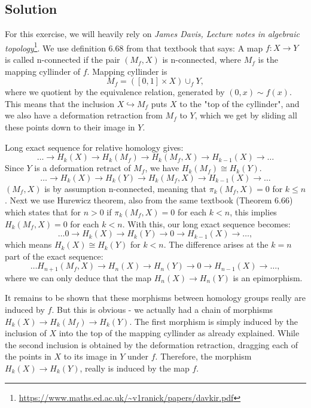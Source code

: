 \documentclass{article}
\begin{document}
\subsection*{Solution}
For this exercise, we will heavily rely on \textit{James Davis, Lecture notes in algebraic topology}\footnote{\url{https://www.maths.ed.ac.uk/~v1ranick/papers/davkir.pdf}}. We use definition 6.68 from that textbook that says:
A map $f: X \to Y$ is called n-connected if the pair $(M_f, X)$ is n-connected, where $M_f$ is the mapping cyllinder of $f$.
Mapping cyllinder is 
\begin{equation*}
M_f = ([0,1] \times X) \cup_f Y,
\end{equation*}
where we quotient by the equivalence relation, generated by $(0,x) \sim f(x)$.
This means that the inclusion $X \hookrightarrow M_f$ puts $X$ to the "{}top of the cyllinder"{}, and we also have a deformation retraction from $M_f$ to $Y$, which we get by sliding all these points down to their image in $Y$.

\noindent
Long exact sequence for relative homology gives:
\begin{equation*}
\dots \to H_k(X) \to H_k(M_f) \to H_k(M_f,X) \to H_{k-1}(X) \to \dots
\end{equation*}
Since $Y$ is a deformation retract of $M_f$, we have $H_k(M_f) \cong H_k(Y)$.
\begin{equation*}
\dots \to H_k(X) \to H_k(Y) \to H_k(M_f,X) \to H_{k-1}(X) \to \dots
\end{equation*}
$(M_f,X)$ is by assumption n-connected, meaning that $\pi_k(M_f,X) = 0$ for $k \leq n$.
Next we use Hurewicz theorem, also from the same textbook (Theorem 6.66) which states that for $n>0$ if  $\pi_k(M_f,X) = 0$ for each $k<n$, this implies $H_k(M_f,X) = 0$ for each $k<n$. With this, our long exact sequence becomes:
\begin{equation*}
\dots 0 \to H_k(X) \to H_k(Y) \to 0 \to H_{k-1}(X) \to \dots,
\end{equation*}
which means $H_k(X) \cong H_k(Y)$ for $k<n$. The difference arises at the $k=n$ part of the exact sequence:
\begin{equation*}
\dots H_{n+1}(M_f,X) \to H_n(X) \to H_n(Y) \to 0 \to H_{n-1}(X) \to \dots,
\end{equation*}
where we can only deduce that the map $H_n(X) \to H_n(Y)$ is an epimorphism.

It remains to be shown that these morphisms between homology groups really are induced by $f$. But this is obvious - we actually had a chain of morphisms $H_k(X) \to H_k(M_f) \to H_k(Y)$. The first morphism is simply induced by the inclusion of $X$ into the top of the mapping cyllinder as already explained. While the second inclusion is obtained by the deformation retraction, dragging each of the points in $X$ to its image in $Y$ under $f$. Therefore, the morphism $H_k(X) \to H_k(Y)$, really is induced by the map $f$.
\newpage
\end{document}
